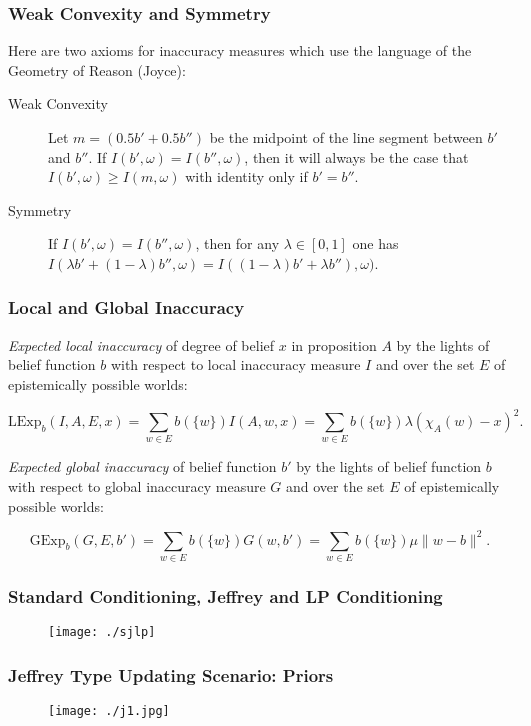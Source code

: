 \documentclass[xcolor=dvipsnames]{beamer}
\begin{document}
\begin{frame}
  \frametitle{Weak Convexity and Symmetry}
Here are two axioms for inaccuracy measures which use the language of
the Geometry of Reason (Joyce):
\begin{description}
\item[Weak Convexity] Let $m=(0.5b'+0.5b'')$ be the midpoint of the line
  segment between $b'$ and $b''$. If $I(b',\omega)=I(b'',\omega)$,
  then it will always be the case that $I(b',\omega)\geq{}I(m,\omega)$
  with identity only if $b'=b''$.
\item[Symmetry] If $I(b',\omega)=I(b'',\omega)$, then for any
  $\lambda\in{}[0,1]$ one has\newline
  $I(\lambda{}b'+(1-\lambda)b'',\omega)=I((1-\lambda){}b'+\lambda{}b''),\omega)$.
\end{description}
\end{frame}

\begin{frame}
  \frametitle{Local and Global Inaccuracy}
\emph{Expected local inaccuracy} of degree of belief $x$ in proposition $A$
by the lights of belief function $b$ with respect to local
inaccuracy measure $I$ and over the set $E$ of epistemically
possible worlds:

\begin{equation}
  \label{eq:eli}
  \mbox{LExp}_{b}(I,A,E,x)=\sum_{w\in{}E}b(\{w\})I(A,w,x)=\sum_{w\in{}E}b(\{w\})\lambda\left(\chi_{A}(w)-x\right)^{2}.
\end{equation}

\emph{Expected global inaccuracy} of belief function $b'$ by the lights of
belief function $b$ with respect to global inaccuracy measure $G$
and over the set $E$ of epistemically possible worlds:

\begin{equation}
  \label{eq:egi}
  \mbox{GExp}_{b}(G,E,b')=\sum_{w\in{}E}b(\{w\})G(w,b')=\sum_{w\in{}E}b(\{w\})\mu\|w-b\|^{2}.
\end{equation}
\end{frame}

\begin{frame}
  \frametitle{Standard Conditioning, Jeffrey and LP Conditioning}
  \begin{figure}[h]
    \texttt{[image: ./sjlp]}
  \end{figure}
\end{frame}

\begin{frame}
  \frametitle{Jeffrey Type Updating Scenario: Priors}
  \begin{figure}[h]
    \texttt{[image: ./j1.jpg]}
  \end{figure}
\end{frame}
\end{document}
